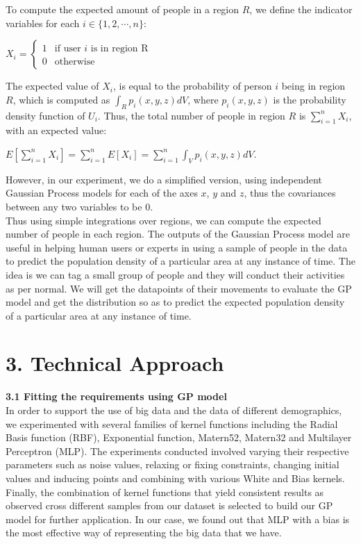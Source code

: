 \documentclass[letterpaper]{article}
\begin{document}
To compute the expected amount of people in a region $R$, we define the indicator variables for each $i \in \{1,2,\cdots,n\}$:
\begin{center}
$X_i =
\begin{cases}
    1 &\text{if user }i\text{ is in region R}\\
    0 &\text{otherwise}
\end{cases}$
\end{center}
The expected value of $X_i$, is equal to the probability of person $i$ being in region $R$, which is computed as $\int_R p_i(x,y,z)dV$, where $p_i(x,y,z)$ is the probability density function of $U_i$. Thus, the total number of people in region $R$ is $\sum_{i=1}^n X_i$, with an expected value:
\begin{center}
$\displaystyle E[\sum_{i=1}^n X_i] = \sum_{i=1}^n E[X_i] = \sum_{i=1}^n \int_V p_i(x,y,z)dV$.
\end{center}

However, in our experiment, we do a simplified version, using independent Gaussian Process models for each of the axes $x$, $y$ and $z$, thus the covariances between any two variables to be $0$. \\

Thus using simple integrations over regions, we can compute the expected number of people in each region. The outputs of the Gaussian Process model are useful in helping human users or experts in using a sample of people in the data to predict the population density of a particular area at any instance of time. The idea is we can tag a small group of people and they will conduct their activities as per normal. We will get the datapoints of their movements to evaluate the GP model and get the distribution so as to predict the expected population density of a particular area at any instance of time. \\

\section{3.  Technical Approach}

{\bf3.1  Fitting the requirements using GP model} \\

In order to support the use of big data and the data of different demographics, we experimented with several families of kernel functions including the Radial Basis function (RBF), Exponential function, Matern52, Matern32 and Multilayer Perceptron (MLP). The experiments conducted involved varying their respective parameters such as noise values, relaxing or fixing constraints, changing initial values and inducing points and combining with various White and Bias kernels. Finally, the combination of kernel functions that yield consistent results as observed cross different samples from our dataset is selected to build our GP model for further application. In our case, we found out that MLP with a bias is the most effective way of representing the big data that we have.\\
\end{document}
